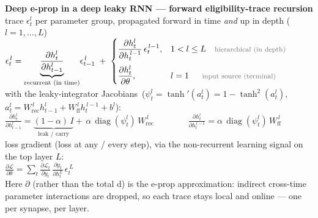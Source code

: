 \documentclass[border=16pt,varwidth=174mm]{standalone}
\newcommand{\note}[1]{{\color{note}\footnotesize #1}}
\newcommand{\Wrec}{W^{\,l}_{\mathrm{rec}}}
\newcommand{\Wff}{W^{\,l}_{\mathrm{ff}}}
\newcommand{\diag}{\operatorname{diag}}
\begin{document}
\begin{minipage}{165mm}
\centering
{\bfseries Deep e-prop in a deep leaky RNN — forward eligibility-trace recursion}\\[1.0ex]
\note{trace $\epsilon^{l}_{t}$ per parameter group, propagated forward in time \emph{and} up in depth ($l=1,\dots,L$)}\\[2.4ex]
$\displaystyle
\epsilon^{\,l}_{t}
=\underbrace{\frac{\partial h^{l}_{t}}{\partial h^{l}_{t-1}}}_{\text{recurrent (in time)}}\!\epsilon^{\,l}_{t-1}
\;+\;
\begin{cases}
\dfrac{\partial h^{l}_{t}}{\partial h^{\,l-1}_{t}}\,\epsilon^{\,l-1}_{t},
   & 1<l\le L \quad \text{\note{hierarchical (in depth)}}\\[2.8ex]
\dfrac{\partial h^{l}_{t}}{\partial \theta},
   & l=1 \quad\;\; \text{\note{input source (terminal)}}
\end{cases}$\\[3.4ex]
\note{with the leaky-integrator Jacobians\, ($\psi^{l}_{t}=\tanh'(a^{l}_{t})=1-\tanh^{2}(a^{l}_{t})$,\ \ $a^{l}_{t}=\Wrec h^{l}_{t-1}+\Wff h^{\,l-1}_{t}+b^{l}$):}\\[1.8ex]
$\displaystyle
\frac{\partial h^{l}_{t}}{\partial h^{l}_{t-1}}
=\underbrace{(1-\alpha)\,I}_{\text{leak / carry}}+\,\alpha\,\diag(\psi^{l}_{t})\,\Wrec
\qquad\qquad
\frac{\partial h^{l}_{t}}{\partial h^{\,l-1}_{t}}
=\alpha\,\diag(\psi^{l}_{t})\,\Wff$\\[3.4ex]
\note{loss gradient (loss at any / every step), via the non-recurrent learning signal on the top layer $L$:}\\[1.8ex]
$\displaystyle
\frac{\partial \mathcal{L}}{\partial \theta}
=\sum_{t}\frac{\partial \mathcal{L}_{t}}{\partial y_{t}}\,
\frac{\partial y_{t}}{\partial h^{L}_{t}}\,
\epsilon^{\,L}_{t}$\\[2.8ex]
\note{Here $\partial$ (rather than the total $\mathrm{d}$) is the e-prop approximation: indirect cross-time parameter interactions are dropped, so each trace stays local and online — one per synapse, per layer.}
\end{minipage}
\end{document}
